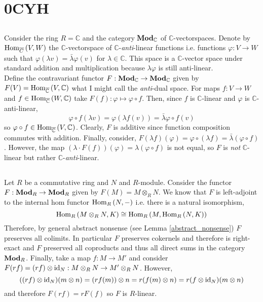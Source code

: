 \documentclass[12pt]{article}
\begin{document}
\section{0CYH}

\subsection{}
\renewcommand{\C}{\mathbb{C}}

Consider the ring $R = \C$ and the category $\Mod{\C}$ of $\C$-vectorspaces. Denote by $\mathrm{Hom}_{\overline{C}} \left( V, W \right)$ the $\C$-vectorspace of $\C$-\textit{anti}-linear functions i.e. functions $\varphi : V \to W$ such that $\varphi(\lambda v) = \bar{\lambda} \varphi(v)$ for $\lambda \in \C$. This space is a $\C$-vector space under standard addition and multiplication because $\lambda \varphi$ is still anti-linear.
\bigskip\\
Define the contravariant functor $F : \Mod{\C} \to \Mod{\C}$ given by $F(V) = \Homover{\overline{\C}}{V}{\C}$ what I might call the \textit{anti}-dual space. For maps $f : V \to W$ and $f \in \Homover{\overline{\C}}{W}{\C}$ take $F(f) : \varphi \mapsto \varphi \circ f$. Then, since $f$ is $\C$-linear and $\varphi$ is $\C$-anti-linear, 
\[ \varphi \circ f(\lambda v) = \varphi(\lambda f(v)) = \bar{\lambda} \varphi \circ f(v) \]
so $\varphi \circ f \in \Homover{\overline{\C}}{V}{\C}$. Clearly, $F$ is additive since function composition commutes with addition. Finally, consider, $F(\lambda f)(\varphi) = \varphi \circ (\lambda f) = \bar{\lambda} (\varphi \circ f)$. However, the map $(\lambda \cdot F(f))(\varphi) = \lambda (\varphi \circ f)$ is not equal, so $F$ is \textit{not} $\C$-linear but rather $\C$-\textit{anti}-linear.

\renewcommand{\C}{\mathcal{C}}

\subsection{}

Let $R$ be a commutative ring and $N$ and $R$-module. Consider the functor $F : \mathbf{Mod}_{R} \to \mathbf{Mod}_{R}$ given by $F(M) = M \otimes_R N$. We know that $F$ is left-adjoint to the internal hom functor $\mathrm{Hom}_{R} \left( N, - \right)$ i.e. there is a natural isomorphism,
\[ \mathrm{Hom}_{R} \left( M \otimes_R N, K \right) \cong \mathrm{Hom}_{R} \left( M, \mathrm{Hom}_{R} \left( N, K \right) \right) \]
Therefore, by general abstract nonsense (see Lemma \ref{abstract_nonsense}) $F$ preserves all colimits. In particular $F$ preserves cokernels and therefore is right-exact and $F$ preserved all coproducts and thus all direct sums in the category $\mathbf{Mod}_{R}$. Finally, take a map $f : M \to M'$ and consider $F(rf) = (rf) \otimes \mathrm{id}_N : M \otimes_R N \to M' \otimes_R N$. However, 
\[ ((rf) \otimes \mathrm{id}_N)(m \otimes n) = (rf(m)) \otimes n = r(f(m) \otimes n) = r (f \otimes \mathrm{id}_N)(m \otimes n) \]
and therefore $F(rf) = r F(f)$ so $F$ is $R$-linear.  
\end{document}
